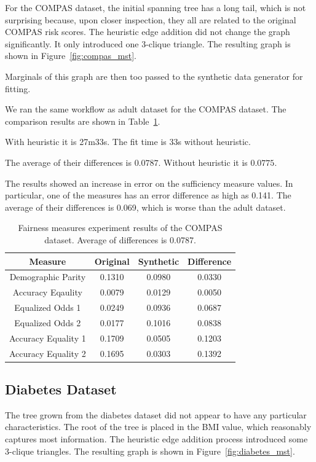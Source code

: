\documentclass[manuscript,screen,review,anonymous]{acmart}
\begin{document}
For the COMPAS dataset, the initial spanning tree has a long tail, which is not surprising because, upon closer inspection, they all are related to the original COMPAS risk scores. The heuristic edge addition did not change the graph significantly. It only introduced one 3-clique triangle. The resulting graph is shown in Figure~\ref{fig:compas_mst}.

Marginals of this graph are then too passed to the synthetic data generator for fitting.

We ran the same workflow as adult dataset for the COMPAS dataset. The comparison results are shown in Table~\ref{tab:compas_score}.


With heuristic it is 27m33s. The fit time is 33s without heuristic.

The average of their differences is $0.0787$. Without heuristic it is $0.0775$.

The results showed an increase in error on the sufficiency measure values. In particular, one of the measures has an error difference as high as 0.141. The average of their differences is 0.069, which is worse than the adult dataset.

\begin{table}[h]
\caption{Fairness measures experiment results of the COMPAS dataset. Average of differences is 0.0787.}
\label{tab:compas_score}
\begin{tabular}{cccc}
\toprule
\textbf{Measure} & \textbf{Original} & \textbf{Synthetic} & \textbf{Difference} \\
\midrule
Demographic Parity  & 0.1310 & 0.0980 & 0.0330 \\
Accuracy Eqaulity   & 0.0079 & 0.0129 & 0.0050 \\
Equalized Odds 1    & 0.0249 & 0.0936 & 0.0687 \\
Equalized Odds 2    & 0.0177 & 0.1016 & 0.0838 \\
Accuracy Equality 1 & 0.1709 & 0.0505 & 0.1203 \\
Accuracy Equality 2 & 0.1695 & 0.0303 & 0.1392 \\
\bottomrule
\end{tabular}
\end{table}

\subsection{Diabetes Dataset}

The tree grown from the diabetes dataset did not appear to have any particular characteristics. The root of the tree is placed in the BMI value, which reasonably captures most information. The heuristic edge addition process introduced some 3-clique triangles. The resulting graph is shown in Figure~\ref{fig:diabetes_mst}.
\end{document}
